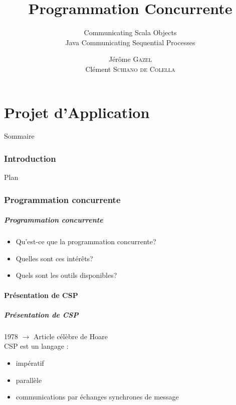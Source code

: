 \documentclass[slidetop,11pt]{beamer}
\title{Programmation Concurrente}
\subtitle{Communicating Scala Objects\\Java Communicating Sequential Processes}
\author{Jérôme \textsc{Gazel} \\ Clément \textsc{Schiano de Colella}}
\institute{\'Ecole Centrale de Nantes}
\date{\oldstylenums{vendredi 25 mars 2011}}
\begin{document}
\frame{\titlepage}
%
\part{Projet d'Application} 
\begin{frame}{Sommaire}
  \small \tableofcontents[hideallsubsections]
\end{frame} 


\section{Introduction}
\begin{frame}{Plan}
  \tableofcontents[sections=\thesection]
\end{frame}
\section{Programmation concurrente}
\begin{frame}[label=pagesimple]
  \frametitle{Programmation concurrente}
    \begin{itemize}[<+->]
  \item Qu'est-ce que la programmation concurrente?
  \item Quelles sont ces intérêts?
   \item Quels sont les outils disponibles?
    \end{itemize}
\end{frame}

\subsection{Présentation de CSP}
\begin{frame} 
  \frametitle{Présentation de CSP}
  1978 $\rightarrow$ Article célèbre de Hoare\\
  CSP est un langage :
\begin{itemize}[<+->]
\item impératif
\item parallèle
\item communications par échanges synchrones de message
 \end{itemize}
\end{frame}
\end{document}
